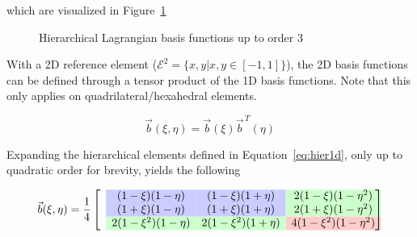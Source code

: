 \documentclass[11pt]{style/memo}
\begin{document}
which are visualized in Figure~\ref{fig:hier1d}

\begin{figure}[h]
    \centering
    \caption{Hierarchical Lagrangian basis functions up to order 3}
    \label{fig:hier1d}
\end{figure}

With a 2D reference element ($\mathcal{E}^2 = \{x,y|x,y\in \left[-1,1\right]\}$), the
2D basis functions can be defined through a tensor product of the 1D basis functions.
Note that this only applies on quadrilateral/hexahedral elements.

\begin{equation}
    \vec{b}(\xi,\eta) = \vec{b}(\xi)\vec{b}^{\, T}(\eta)
\end{equation}

Expanding the hierarchical elements defined in Equation~\ref{eq:hier1d}, only up to
quadratic order for brevity, yields the following

\begin{equation}
    \label{eq:hier2d}
    \vec{b}(\xi,\eta) = \frac{1}{4} \begin{bmatrix}
        & \cellcolor{blue!20!white} (1-\xi)(1-\eta)     & \cellcolor{blue!20!white} (1-\xi)(1+\eta)     & \cellcolor{green!20!white} 2(1-\xi)(1-\eta^2) \\
        & \cellcolor{blue!20!white} (1+\xi)(1-\eta)     & \cellcolor{blue!20!white} (1+\xi)(1+\eta)     & \cellcolor{green!20!white} 2(1+\xi)(1-\eta^2) \\
        & \cellcolor{green!20!white} 2(1-\xi^2)(1-\eta) & \cellcolor{green!20!white} 2(1-\xi^2)(1+\eta) & \cellcolor{red!20!white} 4(1-\xi^2)(1-\eta^2)
    \end{bmatrix}
\end{equation}
\end{document}
